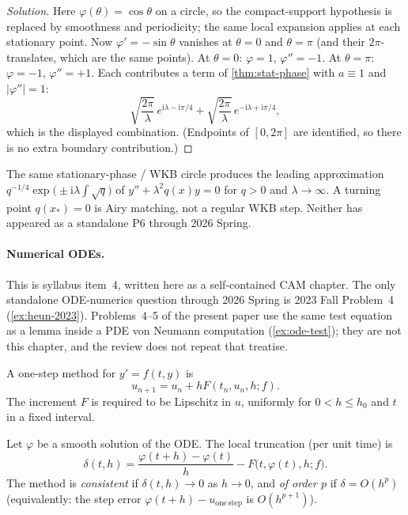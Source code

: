 \documentclass[11pt,a4paper]{article}
\begin{document}
\begin{proof}[Solution]
Here \(\varphi(\theta)=\cos\theta\) on a circle, so the compact-support hypothesis is replaced by smoothness and periodicity; the same local expansion applies at each stationary point. Now \(\varphi'=-\sin\theta\) vanishes at \(\theta=0\) and \(\theta=\pi\) (and their \(2\pi\)-translates, which are the same points). At \(\theta=0\): \(\varphi=1\), \(\varphi''=-1\). At \(\theta=\pi\): \(\varphi=-1\), \(\varphi''=+1\). Each contributes a term of \cref{thm:stat-phase} with \(a\equiv 1\) and \(\lvert\varphi''\rvert=1\):
\[
\sqrt{\frac{2\pi}{\lambda}}\,e^{\mathrm{i}\lambda-\mathrm{i}\pi/4}
+
\sqrt{\frac{2\pi}{\lambda}}\,e^{-\mathrm{i}\lambda+\mathrm{i}\pi/4},
\]
which is the displayed combination. (Endpoints of \([0,2\pi]\) are identified, so there is no extra boundary contribution.)
\end{proof}

\begin{remark}
\label{rem:wkb}
The same stationary-phase / WKB circle produces the leading approximation \(q^{-1/4}\exp\bigl(\pm\mathrm{i}\lambda\int\sqrt{q}\bigr)\) of \(y''+\lambda^{2} q(x)y=0\) for \(q>0\) and \(\lambda\to\infty\). A turning point \(q(x_{*})=0\) is Airy matching, not a regular WKB step. Neither has appeared as a standalone P6 through 2026 Spring.
\end{remark}

\paragraph{Numerical ODEs.}

This is syllabus item~4, written here as a self-contained CAM chapter. The only standalone ODE-numerics question through 2026 Spring is 2023 Fall Problem~4 (\cref{ex:heun-2023}). Problems~4--5 of the present paper use the same test equation as a lemma inside a PDE von Neumann computation (\cref{ex:ode-test}); they are not this chapter, and the review does not repeat that treatise.

A one-step method for \(y'=f(t,y)\) is
\[
u_{n+1}
=
u_{n}+h F(t_{n},u_{n},h;f).
\]
The increment \(F\) is required to be Lipschitz in \(u\), uniformly for \(0<h\le h_{0}\) and \(t\) in a fixed interval.

\begin{definition}
\label{def:ode-consistency}
Let \(\varphi\) be a smooth solution of the ODE. The local truncation (per unit time) is
\[
\delta(t,h)
=
\frac{\varphi(t+h)-\varphi(t)}{h}-F\bigl(t,\varphi(t),h;f\bigr).
\]
The method is \emph{consistent} if \(\delta(t,h)\to 0\) as \(h\to 0\), and \emph{of order \(p\)} if \(\delta=O(h^{p})\) (equivalently: the step error \(\varphi(t+h)-u_{\mathrm{one\,step}}\) is \(O(h^{p+1})\)).
\end{definition}
\end{document}
